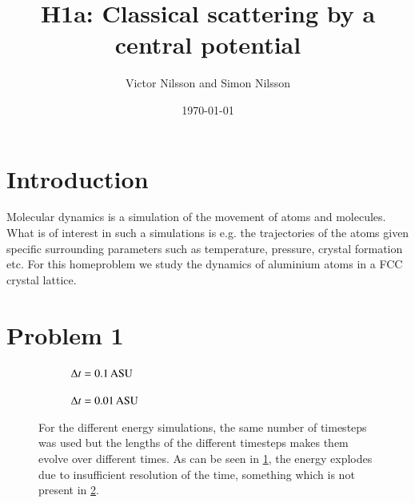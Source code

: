 



\title{H1a: Classical scattering by a central potential}
\author{Victor Nilsson and Simon Nilsson}
\date{\today}





\section*{Introduction}

Molecular dynamics is a simulation of the movement of atoms and molecules. What is of interest in such a simulations is e.g. the trajectories of the atoms given specific surrounding parameters such as temperature, pressure, crystal formation etc. For this homeproblem we study the dynamics of aluminium atoms in a FCC crystal lattice.

\section*{Problem 1}

\begin{figure}[H]
    \centering
    \captionsetup[subfigure]{justification=centering}
    \begin{subfigure}[b]{0.40\textwidth}
        \centering
        \resizebox{\columnwidth}{!}{}
        \caption{$\Delta t =\unit[0.1]{ASU}$}
        \label{fig:timestep_a}
    \end{subfigure}
    \begin{subfigure}[b]{0.40\textwidth}
        \centering
        \resizebox{\columnwidth}{!}{}
        \caption{$\Delta t =\unit[0.01]{ASU}$}
        \label{fig:timestep_b}
    \end{subfigure}
    \caption{For the different energy simulations, the same number of timesteps was used but the lengths of the different timesteps makes them evolve over different times. As can be seen in \ref{fig:timestep_a}, the energy explodes due to insufficient resolution of the time, something which is not present in \ref{fig:timestep_b}.}
    \label{fig:timestep}
\end{figure}

